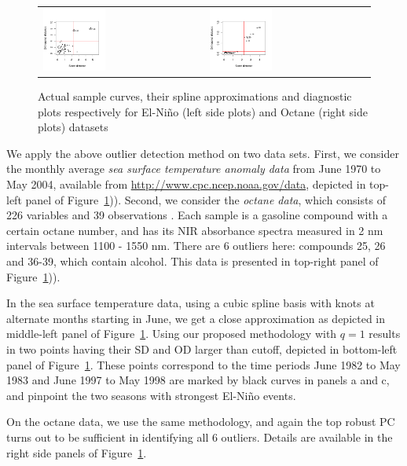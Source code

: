 \begin{figure}[t!]
\begin{center}
\begin{tabular}{ll}
\includegraphics[width=0.4\textwidth]{./Plots/Elnino_functional3} &
\includegraphics[width=0.4\textwidth]{./Plots/Octane_functional3}\\
\end{tabular}
\caption{Actual sample curves, their spline approximations and diagnostic plots respectively for El-Ni\~no (left side plots) and Octane (right side plots) datasets}
\label{fig:fPCAfig}
\end{center}
\end{figure}

We apply the above outlier detection method on two data sets. First, we consider the 
monthly average \textit{sea surface temperature anomaly data} 
from June 1970 to May 2004, available 
from \url{http://www.cpc.ncep.noaa.gov/data}, depicted in  top-left panel
of Figure~\ref{fig:fPCAfig})).
Second, we consider the \textit{octane data}, which consists of 226 variables and 39 
observations \citep{ref:EsbensenetalBook94}. 
Each sample is a gasoline compound with a certain octane 
number, and has its NIR absorbance spectra measured in 2 nm intervals between 1100 - 1550 
nm. There are 6 outliers here: compounds 25, 26 and 36-39, which contain alcohol. This 
data is presented in  top-right panel  of Figure~\ref{fig:fPCAfig})).

In the sea surface temperature data, using a cubic spline basis with knots at alternate 
months starting in June, we get a close approximation as depicted in middle-left
panel  of Figure~\ref{fig:fPCAfig}. Using our proposed methodology with $q =1$ 
results in two points having their SD and OD larger than cutoff, depicted in  
bottom-left panel  of Figure~\ref{fig:fPCAfig}. These points correspond to the time periods June 
1982 to May 1983 and June 1997 to May 1998 are marked by black curves in panels a and c, 
and pinpoint the two seasons with strongest El-Ni\~no events. 


On the octane data, we use the same methodology, 
 and again the top robust PC turns out to be sufficient in identifying all 6 outliers. 
 Details are available in the right side panels  of Figure~\ref{fig:fPCAfig}.